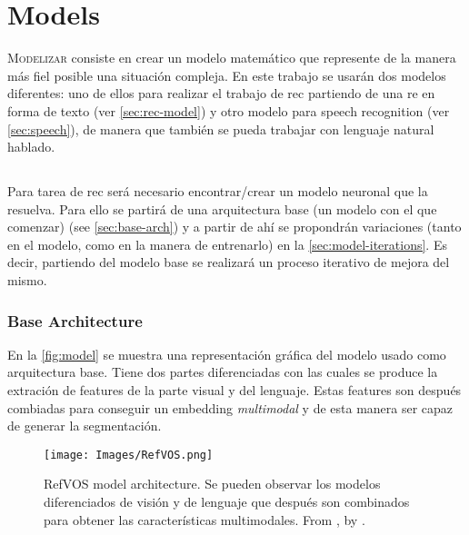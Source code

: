 

\chapter{Models}\label{cha:model}



\lettrine{M}{odelizar} consiste en crear un modelo matemático que represente de
la manera más fiel posible una situación compleja. En este trabajo se usarán
dos modelos diferentes: uno de ellos para realizar el trabajo de \gls{rec}
partiendo de una \gls{re} en forma de texto (ver \vref{sec:rec-model}) y otro
modelo para speech recognition (ver \vref{sec:speech}), de manera que también
se pueda trabajar con lenguaje natural hablado.


\section{}\label{sec:rec-model}

Para tarea de \gls{rec} será necesario encontrar/crear un modelo neuronal que
la resuelva. Para ello se partirá de una arquitectura base (un modelo con el
que comenzar) (see \vref{sec:base-arch}) y a partir de ahí se propondrán
variaciones (tanto en el modelo, como en la manera de entrenarlo) en la
\vref{sec:model-iterations}. Es decir, partiendo del modelo base se realizará
un proceso iterativo de mejora del mismo.

\subsection{Base Architecture}\label{sec:base-arch}

En la \vref{fig:model} se muestra una representación gráfica del modelo usado
como arquitectura base. Tiene dos partes diferenciadas con las cuales se
produce la extración de features de la parte visual y del lenguaje. Estas
features son después combiadas para conseguir un embedding \emph{multimodal} y
de esta manera ser capaz de generar la segmentación.

\begin{figure}[ht]
  \centering
  \texttt{[image: Images/RefVOS.png]}
  \caption[RefVOS model architecture]{RefVOS model architecture. Se pueden
    observar los modelos diferenciados de visión y de lenguaje que después son
    combinados para obtener las características
    multimodales. From , by
    \citeauthor*{bellver20:refvos} \cite{bellver20:refvos}.}
  \label{fig:model}
\end{figure}

